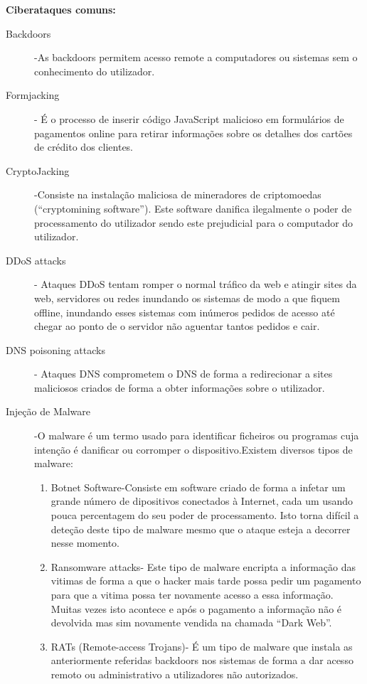 \documentclass{report}
\begin{document}
\maketitle\textbf{{Ciberataques comuns:}}\\
\begin{description}
    \item[Backdoors]-As backdoors permitem acesso remote a computadores ou sistemas sem o conhecimento do utilizador.
    \item[Formjacking]- É o processo de inserir código JavaScript malicioso em formulários de pagamentos online para retirar informações sobre os detalhes dos cartões de crédito dos clientes.
    \item[CryptoJacking]-Consiste na instalação maliciosa de mineradores de criptomoedas (“cryptomining software”). Este software danifica ilegalmente o poder de processamento do utilizador sendo este prejudicial para o computador do utilizador.
    \item [DDoS attacks]- Ataques \ac{DDoS} tentam romper o normal tráfico da web e atingir sites da web, servidores ou redes inundando os sistemas de modo a que fiquem offline, inundando esses sistemas com inúmeros pedidos de acesso até chegar ao ponto de o servidor não aguentar tantos pedidos e cair.
    \item [DNS poisoning attacks]- Ataques \ac{DNS}  comprometem o DNS de forma a redirecionar a sites maliciosos criados de forma a obter informações sobre o utilizador.
    \item [Injeção de Malware]-O malware é um termo usado para identificar ficheiros ou programas cuja intenção é danificar ou corromper o dispositivo.Existem diversos tipos de malware:
    \begin{enumerate}
    	\item Botnet Software-Consiste em software criado de forma a infetar um grande número de dipositivos conectados à Internet, cada um usando pouca percentagem do seu poder de processamento. Isto torna difícil a deteção deste tipo de malware mesmo que o ataque esteja a decorrer nesse momento.
    	\item Ransomware attacks- Este tipo de malware encripta a informação das vitimas de forma a que o hacker mais tarde possa pedir um pagamento para que a vitima possa ter novamente acesso a essa informação. Muitas vezes isto acontece e após o pagamento a informação não é devolvida mas sim novamente vendida na chamada “Dark Web”.
    	\item RATs (Remote-access Trojans)-  É um tipo de malware que instala as anteriormente referidas backdoors nos sistemas de forma a dar acesso remoto ou administrativo a utilizadores não autorizados.

\end{enumerate}
\end{description}
\end{document}
